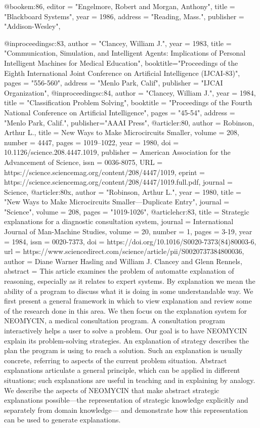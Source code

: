 @book{em:86,
  editor  = "Engelmore, Robert and Morgan, Anthony",
  title   = "Blackboard Systems",
  year    = 1986,
  address = "Reading, Mass.",
  publisher = "Addison-Wesley",
}

@inproceedings{c:83,
  author  = "Clancey, William J.",
  year    = 1983,
  title   = "{Communication, Simulation, and Intelligent
Agents: Implications of Personal Intelligent Machines
for Medical Education}",
  booktitle="Proceedings of the Eighth International Joint Conference on Artificial Intelligence {(IJCAI-83)}",
  pages   = "556-560",
  address = "Menlo Park, Calif",
  publisher = "{IJCAI Organization}",
}
@inproceedings{c:84,
  author  = "Clancey, William J.",
  year    = 1984,
  title   = "{Classification Problem Solving}",
  booktitle = "Proceedings of the Fourth National
              Conference on Artificial Intelligence",
  pages   = "45-54",
  address = "Menlo Park, Calif.",
  publisher="AAAI Press",
}
@article{r:80,
  author = {Robinson, Arthur L.},
  title = {New Ways to Make Microcircuits Smaller},
  volume = {208},
  number = {4447},
  pages = {1019--1022},
  year = {1980},
  doi = {10.1126/science.208.4447.1019},
  publisher = {American Association for the Advancement of Science},
  issn = {0036-8075},
  URL = {https://science.sciencemag.org/content/208/4447/1019},
  eprint = {https://science.sciencemag.org/content/208/4447/1019.full.pdf},
  journal = {Science},
}
@article{r:80x,
  author  = "Robinson, Arthur L.",
  year    = 1980,
  title   = "{New Ways to Make Microcircuits Smaller---Duplicate Entry}",
  journal = "Science",
  volume  =  208,
  pages   = "1019-1026",
}
@article{hcr:83,
title = {Strategic explanations for a diagnostic consultation system},
journal = {International Journal of Man-Machine Studies},
volume = {20},
number = {1},
pages = {3-19},
year = {1984},
issn = {0020-7373},
doi = {https://doi.org/10.1016/S0020-7373(84)80003-6},
url = {https://www.sciencedirect.com/science/article/pii/S0020737384800036},
author = {Diane Warner Hasling and William J. Clancey and Glenn Rennels},
abstract = {This article examines the problem of automatte explanation of reasoning, especially as it relates to expert systems. By explanation we mean the ability of a program to discuss what it is doing in some understandable way. We first present a general framework in which to view explanation and review some of the research done in this area. We then focus on the explanation system for NEOMYCIN, a medical consultation program. A consultation program interactively helps a user to solve a problem. Our goal is to have NEOMYCIN explain its problem-solving strategies. An explanation of strategy describes the plan the program is using to reach a solution. Such an explanation is usually concrete, referring to aspects of the current problem situation. Abstract explanations articulate a general principle, which can be applied in different situations; such explanations are useful in teaching and in explaining by analogy. We describe the aspects of NEOMYCIN that make abstract strategic explanations possible—the representation of strategic knowledge explicitly and separately from domain knowledge— and demonstrate how this representation can be used to generate explanations.}
}
